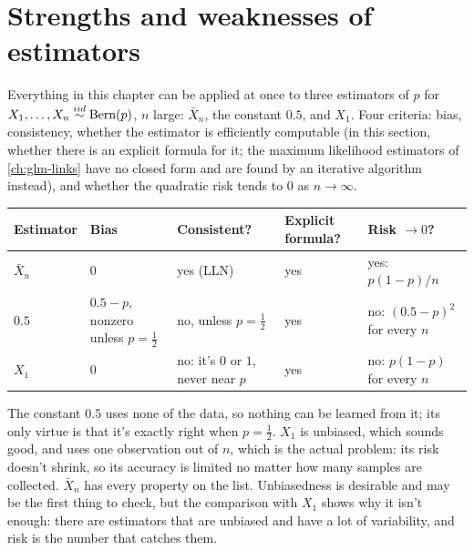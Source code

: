 \section{Strengths and weaknesses of estimators}
\label{sec:est-strengths}

Everything in this chapter can be applied at once to three estimators of $p$ for $X_1, \ldots, X_n \stackrel{iid}{\sim} \text{Bern}(p)$, $n$ large: $\bar{X}_n$, the constant $0.5$, and $X_1$.
Four criteria: bias, consistency, whether the estimator is efficiently computable (in this section, whether there is an explicit formula for it; the maximum likelihood estimators of \cref{ch:glm-links} have no closed form and are found by an iterative algorithm instead), and whether the quadratic risk tends to $0$ as $n \to \infty$.

\begin{center}
\small
\begin{tabular}{@{}l>{\raggedright\arraybackslash}p{1.1in}>{\raggedright\arraybackslash}p{1.1in}>{\raggedright\arraybackslash}p{1.1in}>{\raggedright\arraybackslash}p{1.3in}@{}}
\toprule
Estimator & Bias & Consistent? & Explicit formula? & Risk $\to 0$? \\
\midrule
$\bar{X}_n$ & $0$ & yes (LLN) & yes & yes: $p(1-p)/n$ \\[2pt]
$0.5$ & $0.5 - p$, nonzero unless $p = \frac12$ & no, unless $p = \frac12$ & yes & no: $(0.5 - p)^2$ for every $n$ \\[2pt]
$X_1$ & $0$ & no: it's $0$ or $1$, never near $p$ & yes & no: $p(1-p)$ for every $n$ \\
\bottomrule
\end{tabular}
\end{center}

The constant $0.5$ uses none of the data, so nothing can be learned from it; its only virtue is that it's exactly right when $p = \frac12$.
$X_1$ is unbiased, which sounds good, and uses one observation out of $n$, which is the actual problem: its risk doesn't shrink, so its accuracy is limited no matter how many samples are collected.
$\bar{X}_n$ has every property on the list.
Unbiasedness is desirable and may be the first thing to check, but the comparison with $X_1$ shows why it isn't enough: there are estimators that are unbiased and have a lot of variability, and risk is the number that catches them.

